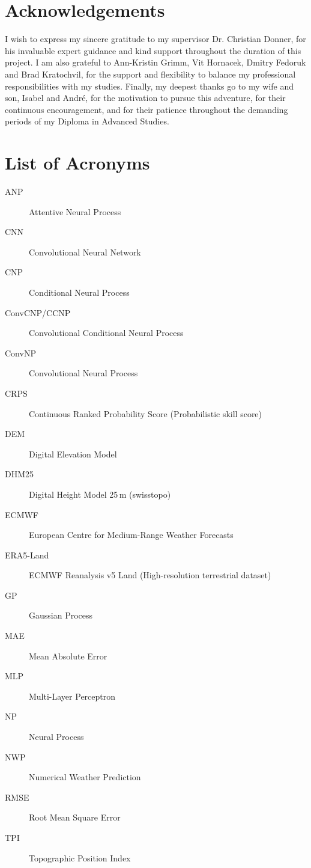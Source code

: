 \section*{Acknowledgements}

\par{
I wish to express my sincere gratitude to my supervisor Dr. Christian Donner, for his invaluable expert guidance and kind support throughout the duration of this project. I am also grateful to Ann-Kristin Grimm, Vit Hornacek, Dmitry Fedoruk and Brad Kratochvil, for the support and flexibility to balance my professional responsibilities with my studies. Finally, my deepest thanks go to my wife and son, Isabel and André, for the motivation to pursue this adventure, for their continuous encouragement, and for their patience throughout the demanding periods of my Diploma in Advanced Studies.
}

\tableofcontents
\listoffigures
\listoftables

\section*{List of Acronyms}
\begin{description}
    \item[ANP] Attentive Neural Process
    \item[CNN] Convolutional Neural Network
    \item[CNP] Conditional Neural Process
    \item[ConvCNP/CCNP] Convolutional Conditional Neural Process
    \item[ConvNP] Convolutional Neural Process
    \item[CRPS] Continuous Ranked Probability Score (Probabilistic skill score)
    \item[DEM] Digital Elevation Model
    \item[DHM25] Digital Height Model 25\,m (swisstopo)
    \item[ECMWF] European Centre for Medium-Range Weather Forecasts
    \item[ERA5-Land] ECMWF Reanalysis v5 Land (High-resolution terrestrial dataset)
    \item[GP] Gaussian Process
    \item[MAE] Mean Absolute Error
    \item[MLP] Multi-Layer Perceptron
    \item[NP] Neural Process
    \item[NWP] Numerical Weather Prediction
    \item[RMSE] Root Mean Square Error
    \item[TPI] Topographic Position Index
\end{description}

\newpage